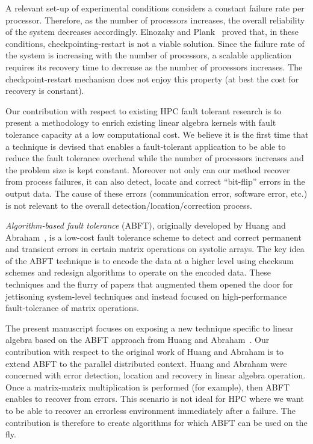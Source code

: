 \documentclass[pdftex,11pt]{article}
\begin{document}
A relevant set-up of experimental conditions considers a constant
failure rate per processor. Therefore, as the number of processors
increases, the overall reliability of the system decreases
accordingly.  Elnozahy and Plank~\cite{ElPl:04} proved that, in these
conditions, checkpointing-restart is not a viable solution.  Since the
failure rate of the system is increasing with the number of
processors, a scalable application requires its recovery time to
decrease as the number of processors increases. The checkpoint-restart
mechanism does not enjoy this property (at best the cost for recovery
is constant).

Our contribution with respect to existing HPC fault tolerant research
is to present a methodology to enrich existing linear algebra kernels
with fault tolerance capacity at a low computational cost. We believe
it is the first time that a technique is devised that enables a
fault-tolerant application to be able to reduce the fault tolerance
overhead while the number of processors increases and the problem size
is kept constant. Moreover not only can our method recover from
process failures, it can also detect, locate and correct ``bit-flip''
errors in the output data. The cause of these errors (communication
error, software error, etc.) is not relevant to the overall
detection/location/correction process.

\textit{Algorithm-based fault tolerance} (ABFT), originally developed
by Huang and Abraham~\cite{HuAb:84}, is a low-cost fault tolerance
scheme to detect and correct permanent and transient errors in certain
matrix operations on systolic arrays. The key idea of the ABFT
technique is to encode the data at a higher level using checksum
schemes and redesign algorithms to operate on the encoded data. These
techniques and the flurry of papers that augmented them
\cite{BaAb:86,Bane:90,LuPa:88,RoBa:94} opened the door for jettisoning
system-level techniques and instead focused on high-performance
fault-tolerance of matrix operations.





The present manuscript focuses on exposing a new technique specific to
linear algebra based on the ABFT approach from Huang and
Abraham~\cite{HuAb:84}.  Our contribution with respect to the original
work of Huang and Abraham is to extend ABFT to the parallel
distributed context. Huang and Abraham were concerned with error
detection, location and recovery in linear algebra operation. Once a
matrix-matrix multiplication is performed (for example), then ABFT
enables to recover from errors.  This scenario is not ideal for HPC
where we want to be able to recover an errorless environment
immediately after a failure.  The contribution is therefore to create
algorithms for which ABFT can be used on the fly.
\end{document}
